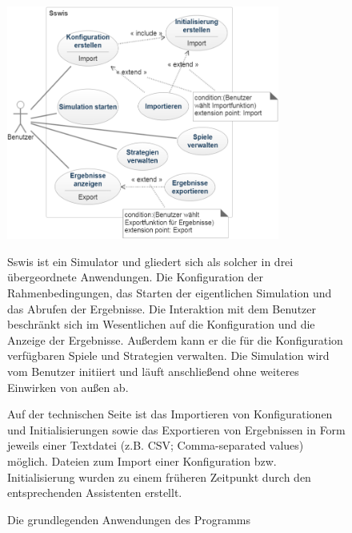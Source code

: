 \begin{figure}[htbp]
{\centering 
\includegraphics[width=0.8\textwidth]{Anwendungsfalldiagramme/usecase_sswis2.png}
\caption{Die grundlegenden Anwendungen des Programms} }
\bigskip
Sswis ist ein Simulator und gliedert sich als solcher in drei übergeordnete Anwendungen. Die Konfiguration der Rahmenbedingungen, das Starten der eigentlichen Simulation und das Abrufen der Ergebnisse. Die Interaktion mit dem Benutzer beschränkt sich im Wesentlichen auf die Konfiguration und die Anzeige der Ergebnisse. Außerdem kann er die für die Konfiguration verfügbaren Spiele und Strategien verwalten\footnotemark. Die Simulation wird vom Benutzer initiiert und läuft anschließend ohne weiteres Einwirken von außen ab.

Auf der technischen Seite ist das Importieren von Konfigurationen und Initialisierungen sowie das Exportieren von Ergebnissen in Form jeweils einer Textdatei (z.B. CSV; Comma-separated values) möglich. Dateien zum Import einer Konfiguration bzw. Initialisierung wurden zu einem früheren Zeitpunkt durch den entsprechenden Assistenten erstellt.

\end{figure}

